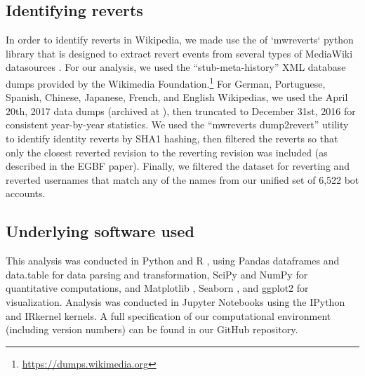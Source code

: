 \documentclass[format=acmsmall, review=false, screen=true]{acmart}%
\begin{document}
\subsection{Identifying reverts}  

In order to identify reverts in Wikipedia, we made use the of `mwreverts` python library that is designed to extract revert events from several types of MediaWiki datasources \cite{Halfaker2017}.  For our analysis, we used the ``stub-meta-history'' XML database dumps provided by the Wikimedia Foundation.\footnote{ \url{https://dumps.wikimedia.org} }  For German, Portuguese, Spanish, Chinese, Japanese, French, and English Wikipedias, we used the April 20th, 2017 data dumps (archived at \cite{dumps}), then truncated to December 31st, 2016 for consistent year-by-year statistics. We used the ``mwreverts dump2revert'' utility to identify identity reverts by SHA1 hashing, then filtered the reverts so that only the closest reverted revision to the reverting revision was included (as described in the EGBF paper). Finally, we filtered the dataset for reverting and reverted usernames that match any of the names from our unified set of 6,522 bot accounts.

\subsection{Underlying software used}
This analysis was conducted in Python \citep{python} and R \citep{RManual}, using Pandas dataframes \citep{pandas} and data.table \citep{datatable} for data parsing and transformation, SciPy \citep{scipy} and NumPy \citep{numpy} for quantitative computations, and Matplotlib \citep{Matplotlib}, Seaborn \citep{seaborn}, and ggplot2 \citep{ggplot2} for visualization. Analysis was conducted in Jupyter Notebooks \citep{jupyter} using the IPython \citep{ipython} and IRkernel kernels. A full specification of our computational environment (including version numbers) can be found in our GitHub repository.
\end{document}
